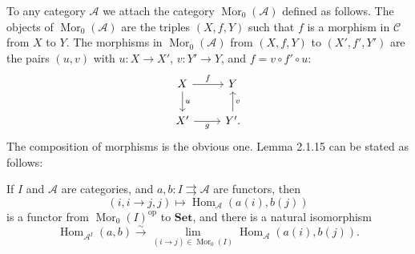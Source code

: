 \documentclass[12pt]{article}
\theoremstyle{remark}
\theoremstyle{definition}
\newcommand{\A}{\mathcal A}
\newcommand{\C}{\mathcal C}
\newcommand{\Set}{\mathbf{Set}}
\newcommand{\parar}{\rightrightarrows}
\newcommand{\xr}{\xrightarrow}
\DeclareMathOperator{\Hom}{Hom}
\DeclareMathOperator{\Mor}{Mor}
\DeclareMathOperator{\op}{op}
\begin{document}
To any category $\A$ we attach the category $\Mor_0(\A)$ defined as follows. The objects of $\Mor_0(\A)$ are the triples $(X,f,Y)$ such that $f$ is a morphism in $\C$ from $X$ to $Y$. The morphisms in $\Mor_0(\A)$ from $(X,f,Y)$ to $(X',f',Y')$ are the pairs $(u,v)$ with $u:X\to X'$, $v:Y'\to Y$, and $f=v\circ f'\circ u$:
$$
\begin{tikzcd}
X\ar{d}{u}\ar{r}{f}&Y\\ 
X'\ar{r}[swap]{g}&Y'\ar{u}[swap]{v}.
\end{tikzcd}
$$ 
The composition of morphisms is the obvious one. Lemma 2.1.15 can be stated as follows: 

If $I$ and $\A$ are categories, and $a,b:I\parar\A$ are functors, then 
$$
(i,i\to j,j)\mapsto\Hom_\A(a(i),b(j))
$$ 
is a functor from $\Mor_0(I)^{\op}$ to $\Set$, and there is a natural isomorphism 
%
\begin{equation}\label{2115} 
\Hom_{\A^I}(a,b)\xr\sim\lim_{(i\to j)\in\Mor_0(I)}\Hom_\A(a(i),b(j)).
\end{equation}
%
\end{document}
